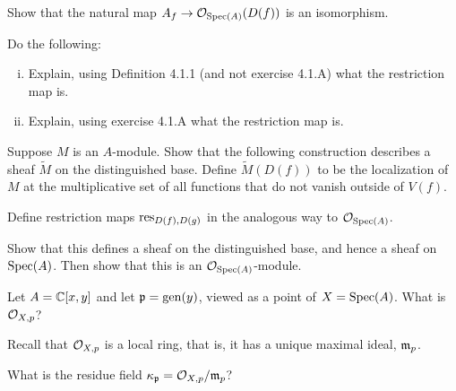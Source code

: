 \documentclass[12pt]{memoir}
\begin{document}

    \begin{Ej}[4.1.A Vakil]
        Show that the natural map $A_f\to\mathcal{O}_{\operatorname{Spec}(A)}(D(f))$ is an isomorphism. 
    \end{Ej}
    \begin{ptcbr}
    
    \end{ptcbr}

    \begin{Ej}[Restrictions]
        Do the following:
        \begin{enumerate}[i)]
            \itemsep=-0.4em
            \item Explain, using Definition 4.1.1 (and not exercise 4.1.A) what the restriction map is.
            \item Explain, using exercise 4.1.A what the restriction map is.
        \end{enumerate}
    \end{Ej}
    
    \begin{ptcbr}
    
    \end{ptcbr}

    \begin{Ej}[4.1.D Vakil]
        Suppose $M$ is an $A$-module. Show
that the following construction describes a sheaf $\widetilde{M}$ on the distinguished base. Define $\widetilde{M}(D(f))$ to be the localization of $M$ at the multiplicative set of all functions that do not vanish outside of $V(f)$.\par
 Define restriction maps $\operatorname*{res}_{D(f),D(g)}$ in the analogous way to $\mathcal{O}_{\operatorname{Spec}(A)}$.\par
  Show that this defines a sheaf on the distinguished base, and hence a sheaf on $\operatorname{Spec}(A)$. Then show that this is an $\mathcal{O}_{\operatorname{Spec}(A)}$-module.
    \end{Ej}
    
    \begin{ptcbr}
    
    \end{ptcbr}

    \begin{Ej}
        Let $A = \mathbb{C}[x,y]$ and let $\mathfrak{p}=\operatorname{gen}(y)$, viewed as a point of $X = \operatorname{Spec}(A)$. What is $\mathcal{O}_{X,p}$?\par
        Recall that $\mathcal{O}_{X,p}$ is a local ring, that is, it has a unique maximal ideal, $\mathfrak{m}_p$.\par 
        What is the residue field $\kappa_{\mathfrak{p}}=\mathcal{O}_{X,p}/\mathfrak{m}_p$?
    \end{Ej}
    
\end{document}
